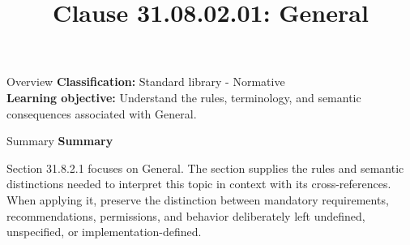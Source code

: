 \documentclass[10pt,letterpaper]{article}
\title{Clause 31.08.02.01: General}
\author{}
\date{}
\begin{document}
\maketitle
\begin{CornellOverviewBox}{Overview}
\textbf{Classification:} Standard library - Normative\\[2pt]
\textbf{Learning objective:} Understand the rules, terminology, and semantic consequences associated with General.
\end{CornellOverviewBox}\begin{CornellSummaryBox}{Summary}
{\sffamily\bfseries\color{Accent} Summary}\par\vspace{3pt}Section 31.8.2.1 focuses on General. The section supplies the rules and semantic distinctions needed to interpret this topic in context with its cross-references. When applying it, preserve the distinction between mandatory requirements, recommendations, permissions, and behavior deliberately left undefined, unspecified, or implementation-defined.
\end{CornellSummaryBox}
\end{document}
